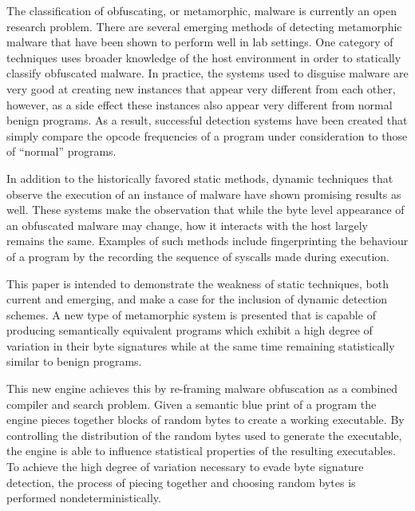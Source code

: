 
    The classification of obfuscating, or metamorphic, malware is currently an
    open research problem. There are several emerging methods of detecting
    metamorphic malware that have been shown to perform well in lab settings.
    One category of techniques uses broader knowledge of the host environment in
    order to statically classify obfuscated malware. In practice, the systems
    used to disguise malware are very good at creating new instances that appear
    very different from each other, however, as a side effect these instances
    also appear very different from normal benign programs. As a result,
    successful detection systems have been created that simply compare the
    opcode frequencies of a program under consideration to those of ``normal''
    programs.

    In addition to the historically favored static methods, dynamic techniques
    that observe the execution of an instance of malware have shown promising
    results as well. These systems make the observation that while the byte
    level appearance of an obfuscated malware may change, how it interacts with
    the host largely remains the same. Examples of such methods include
    fingerprinting the behaviour of a program by the recording the sequence of
    syscalls made during execution.

    
    This paper is intended to demonstrate the weakness of static techniques,
    both current and emerging, and make a case for the inclusion of dynamic
    detection schemes. A new type of metamorphic system is presented that is
    capable of producing semantically equivalent programs which exhibit a high
    degree of variation in their byte signatures while at the same time
    remaining statistically similar to benign programs.

    This new engine achieves this by re-framing malware obfuscation as a
    combined compiler and search problem. Given a semantic blue print of a
    program the engine pieces together blocks of random bytes to create a
    working executable. By controlling the distribution of the random bytes used
    to generate the executable, the engine is able to influence statistical
    properties of the resulting executables. To achieve the high degree of
    variation necessary to evade byte signature detection, the process of
    piecing together and choosing random bytes is performed
    nondeterministically.
     

